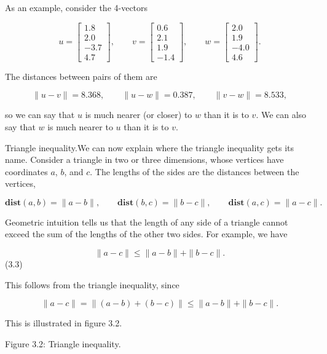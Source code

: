 As an example, consider the 4-vectors

\[u=\left[\begin{array}{c}1.8\\ 2.0\\ -3.7\\ 4.7\end{array}\right],\qquad v=\left[\begin{array}{c}0.6\\ 2.1\\ 1.9\\ -1.4\end{array}\right],\qquad w=\left[\begin{array}{c}2.0\\ 1.9\\ -4.0\\ 4.6\end{array}\right].\]

The distances between pairs of them are

\[\|u-v\|=8.368,\qquad\|u-w\|=0.387,\qquad\|v-w\|=8.533,\]

so we can say that \(u\) is much nearer (or closer) to \(w\) than it is to \(v\). We can also say that \(w\) is much nearer to \(u\) than it is to \(v\).

Triangle inequality.We can now explain where the triangle inequality gets its name. Consider a triangle in two or three dimensions, whose vertices have coordinates \(a\), \(b\), and \(c\). The lengths of the sides are the distances between the vertices,

\[\mathbf{dist}(a,b)=\|a-b\|,\qquad\mathbf{dist}(b,c)=\|b-c\|,\qquad\mathbf{dist }(a,c)=\|a-c\|.\]

Geometric intuition tells us that the length of any side of a triangle cannot exceed the sum of the lengths of the other two sides. For example, we have

\[\|a-c\|\leq\|a-b\|+\|b-c\|.\] (3.3)

This follows from the triangle inequality, since

\[\|a-c\|=\|(a-b)+(b-c)\|\leq\|a-b\|+\|b-c\|.\]

This is illustrated in figure 3.2.

Figure 3.2: Triangle inequality.

 
